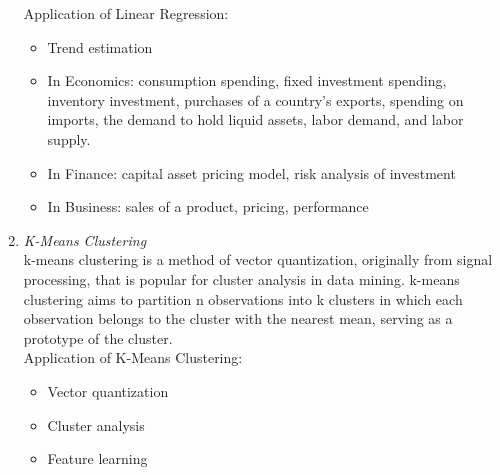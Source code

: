 \documentclass[a4paper,12pt]{report}
\begin{document}
\begin{enumerate}
    	Application of Linear Regression:
    	\begin{itemize}
    		\item Trend estimation
    		\item In Economics:  consumption spending, fixed investment spending, inventory investment, purchases of a country's exports, spending on imports, the demand to hold liquid assets, labor demand, and labor supply.
    		\item In Finance: capital asset pricing model, risk analysis of investment
    		\item In Business: sales of a product, pricing, performance      
    	\end{itemize}
    	
    	\item \emph{K-Means Clustering}\\
    	k-means clustering is a method of vector quantization, originally from signal processing, that is 		popular for cluster analysis in data mining. k-means clustering aims to partition n observations 			into k clusters in which each observation belongs to the cluster with the nearest mean, serving 			as a prototype of the cluster.
       	\\
    	Application of K-Means Clustering:
    	\begin{itemize}
    		\item Vector quantization
    		\item Cluster analysis
    		\item Feature learning
    		   
    	\end{itemize}
    	

\end{enumerate}
\end{document}
